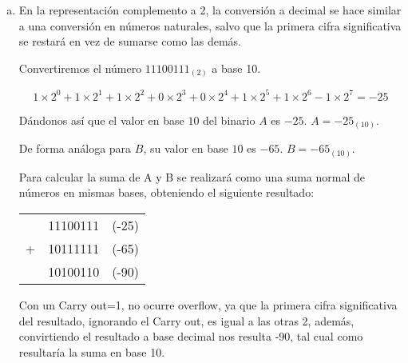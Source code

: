 \begin{frame}
	\begin{solution}
		\begin{enumerate}[b)]
			\item
                En la representación complemento a 2, la conversión a decimal se hace similar a una conversión en números naturales, salvo que la primera cifra significativa se restará en vez de sumarse como las demás.
                
                Convertiremos el número $11100111_{(2)}$ a base 10.

                \begin{equation*}
				      1\times 2^{0}+
				      1\times2^{1}+
				      1\times2^{2}+
				      0\times2^{3}+
				      0\times2^{4}+
				      1\times2^{5}+
				      1\times2^{6}-
                        1\times2^{7}=
				      -25
			      \end{equation*}

                Dándonos así que el valor en base $10$ del binario $A$ es
			      $-25$.
			      $A=-{25}_{\left(10\right)}$.

			      De forma análoga para $B$, su valor en base $10$ es $-65$.
			      $B=-{65}_{\left(10\right)}$.

                Para calcular la suma de A y B se realizará como una suma normal de números en mismas bases, obteniendo el siguiente resultado:

                \begin{table}[]
                    \begin{tabular}{c c c}
                         & 11100111 & (-25)\\
                        + & 10111111 & (-65)\\
                        \hline
                        & 10100110 & (-90)
                    \end{tabular}
                \end{table}
                Con un Carry out=1, no ocurre overflow, ya que la primera cifra significativa del resultado, ignorando el Carry out, es igual a las otras 2, además, convirtiendo el resultado a base decimal nos resulta -90, tal cual como resultaría la suma en base 10.
                               
		\end{enumerate}
	\end{solution}
\end{frame}

